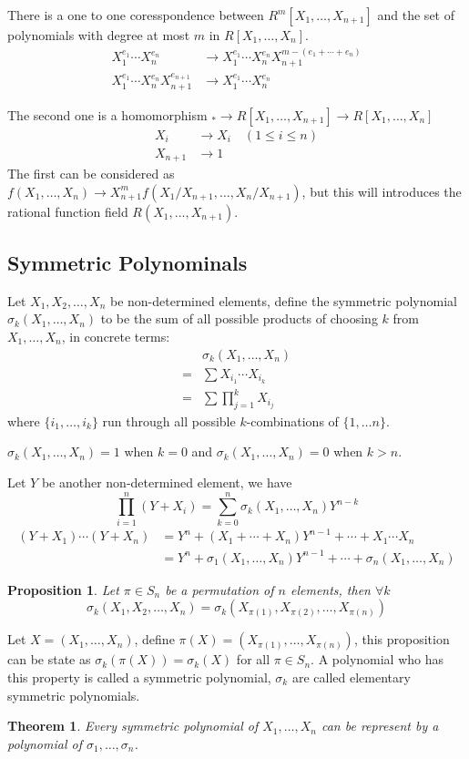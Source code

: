 \documentclass{article}
\newtheorem*{pro}{Proposition}
\newtheorem*{thm}{Theorem}
\begin{document}
There is a one to one coresspondence between $R^m[X_1, \dots, X_{n+1}]$ and the set of
polynomials with degree at most $m$ in $R[X_1, \dots, X_n]$.
\begin{align*}
X_1^{e_1}\cdots X_n^{e_n} &\to X_1^{e_1}\cdots X_n^{e_n} X_{n+1}^{m - (e_1 + \cdots + e_n)} \\
X_1^{e_1}\cdots X_n^{e_n} X_{n+1}^{e_{n+1}} &\to X_1^{e_1}\cdots X_n^{e_n}
\end{align*}

The second one is a homomorphism ${ }_\ast \to R[X_1, \dots, X_{n+1}] \to R[X_1, \dots, X_n]$
\begin{align*}
X_i &\to X_i \quad (1 \leq i \leq n)\\
X_{n + 1} &\to 1
\end{align*}
The first can be considered as
$f(X_1, \dots, X_n) \to X_{n+1}^m f(X_1 / X_{n+1}, \dots, X_n / X_{n+1})$,
but this will introduces the rational function field $R(X_1, \dots, X_{n+1})$.


\subsection{Symmetric Polynominals}
Let $X_1, X_2, \dots, X_n$ be non-determined elements,
define the symmetric polynomial $\sigma_k(X_1, \dots, X_n)$
to be the sum of all possible products of choosing $k$ from $X_1, \dots, X_n$,
in concrete terms:
\begin{align*}
  &\sigma_k(X_1, \dots, X_n) \\
  = &\sum X_{i_1} \cdots X_{i_k} \\
  = &\sum \prod_{j=1}^{k} X_{i_j}
\end{align*}
where $\{i_1, \dots, i_k\}$ run through all possible $k$-combinations of $\{1, \dots n\}$.

$\sigma_k(X_1, \dots, X_n) = 1$ when $k = 0$ and $\sigma_k(X_1, \dots, X_n) = 0$ when $k > n$.

Let $Y$ be another non-determined element, we have
$$\prod_{i=1}^{n} (Y + X_i) = \sum_{k=0}^{n} \sigma_k(X_1, \dots, X_n) Y^{n - k}$$
\begin{align*}
  (Y + X_1) \cdots (Y + X_n)
  &= Y^n + (X_1 + \cdots + X_n) Y^{n - 1} + \cdots + X_1 \cdots  X_n \\
  &= Y^n + \sigma_1(X_1, \dots, X_n) Y^{n - 1} + \cdots + \sigma_n(X_1, \dots, X_n)
\end{align*}
\begin{pro}
Let $\pi \in S_n$ be a permutation of $n$ elements, then $\forall k$
$$\sigma_k(X_1, X_2, \dots, X_n) = \sigma_k(X_{\pi(1)}, X_{\pi(2)}, \dots, X_{\pi(n)})$$
\end{pro}
Let $X = (X_1, \dots, X_n)$, define $\pi(X) = (X_{\pi(1)}, \dots, X_{\pi(n)})$,
this proposition can be state as $\sigma_k(\pi(X)) = \sigma_k(X)$ for all $\pi \in S_n$.
A polynomial who has this property is called a symmetric polynomial,
$\sigma_k$ are called elementary symmetric polynomials.
\begin{thm}
Every symmetric polynomial of $X_1, \dots, X_n$ can be represent by a polynomial of
$\sigma_1, \dots, \sigma_n$.
\end{thm}
\end{document}
